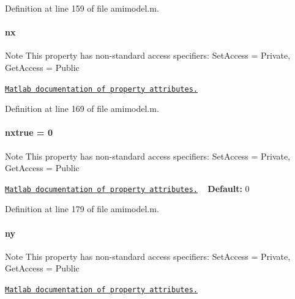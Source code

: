 Definition at line 159 of file amimodel.\+m.

\hypertarget{classamimodel_a84e4236f07668a770c27567f1f9615ff}{}
\paragraph[{nx}]{\setlength{\rightskip}{0pt plus 5cm}nx}\label{classamimodel_a84e4236f07668a770c27567f1f9615ff}
\begin{DoxyNote}{Note}
This property has non-\/standard access specifiers\+: {\ttfamily Set\+Access = Private, Get\+Access = Public} 

\href{http://www.mathworks.com/help/matlab/matlab_oop/property-attributes.html}{\tt Matlab documentation of property attributes.} 
\end{DoxyNote}


Definition at line 169 of file amimodel.\+m.

\hypertarget{classamimodel_a49c476de14a021114feb8c95da04952a}{}
\paragraph[{nxtrue}]{\setlength{\rightskip}{0pt plus 5cm}nxtrue = 0}\label{classamimodel_a49c476de14a021114feb8c95da04952a}
\begin{DoxyNote}{Note}
This property has non-\/standard access specifiers\+: {\ttfamily Set\+Access = Private, Get\+Access = Public} 

\href{http://www.mathworks.com/help/matlab/matlab_oop/property-attributes.html}{\tt Matlab documentation of property attributes.} ~\newline
{\bfseries Default\+:} 0 
\end{DoxyNote}


Definition at line 179 of file amimodel.\+m.

\hypertarget{classamimodel_a289ca425eb368f1d582b6be2be0d3dfc}{}
\paragraph[{ny}]{\setlength{\rightskip}{0pt plus 5cm}ny}\label{classamimodel_a289ca425eb368f1d582b6be2be0d3dfc}
\begin{DoxyNote}{Note}
This property has non-\/standard access specifiers\+: {\ttfamily Set\+Access = Private, Get\+Access = Public} 

\href{http://www.mathworks.com/help/matlab/matlab_oop/property-attributes.html}{\tt Matlab documentation of property attributes.} 
\end{DoxyNote}


